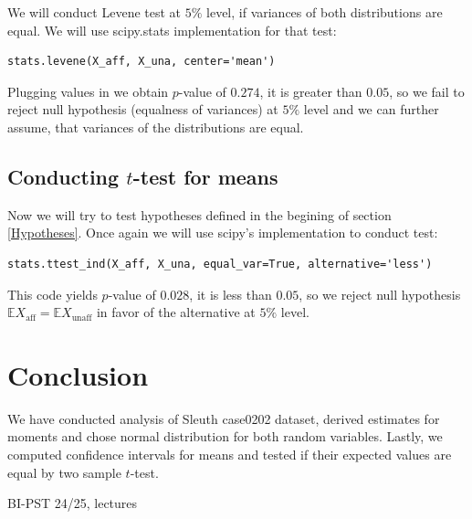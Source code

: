 \documentclass[12pt,a4paper]{article} %
\newcommand{\randv}[2][X]{#1_{\text{#2}}}
\newcommand{\E}{\mathbb{E}}
\begin{document}
We will conduct Levene test at $5\%$ level, if variances of both distributions are equal. We will use scipy.stats implementation for that test:

\begin{lstlisting}
stats.levene(X_aff, X_una, center='mean')
\end{lstlisting}

Plugging values in we obtain $p$-value of $0.274$, it is greater than $0.05$, so we fail to reject null hypothesis (equalness of variances) at $5\%$ level and we can further assume, that variances of the distributions are equal. 

\subsection{Conducting $t$-test for means}

Now we will try to test hypotheses defined in the begining of section \ref{Hypotheses}. Once again we will use scipy's implementation to conduct test:

\begin{lstlisting}
stats.ttest_ind(X_aff, X_una, equal_var=True, alternative='less')
\end{lstlisting}

This code yields $p$-value of $0.028$, it is less than $0.05$, so we reject null hypothesis $\E\randv{aff} = \E\randv{unaff}$ in favor of the alternative at $5\%$ level.

\section{Conclusion}
We have conducted analysis of Sleuth case0202 dataset, derived estimates for moments and chose normal distribution for both random variables. Lastly, we computed confidence intervals for means and tested if their expected values are equal by two sample $t$-test.


\begin{thebibliography}{99}
 BI-PST 24/25, lectures
\end{thebibliography}
\end{document}
